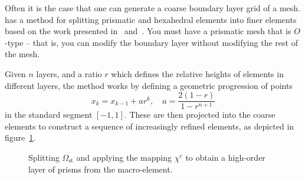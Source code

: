 Often it is the case that one can generate a coarse boundary layer grid of a
mesh. \mc has a method for splitting prismatic and hexahedral elements into
finer elements based on the work presented in~\cite{MoHaPeSh14}
and~\cite{MoHaPeSh14b}. You must have a prismatic mesh that is $O$-type -- that
is, you can modify the boundary layer without modifying the rest of the mesh.

Given $n$ layers, and a ratio $r$ which defines the relative heights of elements
in different layers, the method works by defining a geometric progression of
points
\[
x_k = x_{k-1} + ar^k, \quad a = \frac{2(1-r)}{1 - r^{n+1}}
\]
in the standard segment $[-1,1]$. These are then projected into the coarse
elements to construct a sequence of increasingly refined elements, as depicted
in figure~\ref{fig:util:mc:split}.

\begin{figure}
  \begin{center}
  \end{center}
  \caption{Splitting $\Omega_{\text{st}}$ and applying the mapping $\chi^e$ to
    obtain a high-order layer of prisms from the macro-element.}
  \label{fig:util:mc:split}
\end{figure}

